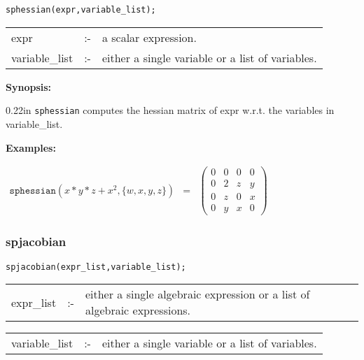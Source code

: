 \hspace*{0.175in} \texttt{sphessian(expr,variable\_list);}

\hspace*{0.1in} 
\begin{tabular}{l l l}
expr           &:-& a scalar expression. \\
variable\_list &:-& either a single variable or a list of variables.
\end{tabular}

\textbf{Synopsis:} 

\begin{addtolength}{\leftskip}{0.22in}
                \texttt{sphessian} computes the hessian matrix of expr w.r.t.
                the variables in variable\_list. 

\end{addtolength}

\textbf{Examples:}

\begin{flushleft}  
\hspace*{0.1in}
\begin{math}        
\begin{array}{ccc}
\texttt{sphessian}(x*y*z+x^2,\{w,x,y,z\}) & = & 
\left( \begin{array}{cccc} 0 & 0 & 0 & 0 \\ 0 & 2 & z & y \\ 0 & z & 0 
& x \\ 0 & y & x & 0
\end{array} \right)
\end{array}
\end{math}  
\end{flushleft}


\subsubsection{spjacobian}

\hspace*{0.175in} \texttt{spjacobian(expr\_list,variable\_list);}

\hspace*{0.1in} 
\begin{tabular}{l l l}
expr\_list   \hspace*{0.175in}  &:-& \parbox[t]{.72\linewidth}{either a 
single algebraic expression or a list of algebraic expressions.} 
\end{tabular}

\vspace*{0.04in}
\hspace*{0.1in}
\begin{tabular}{l l l}
variable\_list &:-& either a single variable or a list of variables.
\end{tabular}

